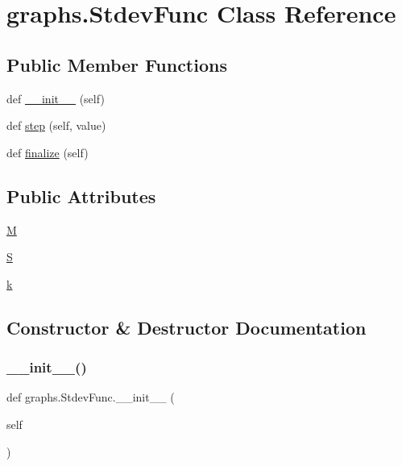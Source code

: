 \hypertarget{classgraphs_1_1StdevFunc}{}\section{graphs.\+Stdev\+Func Class Reference}
\label{classgraphs_1_1StdevFunc}
\subsection*{Public Member Functions}
\begin{DoxyCompactItemize}
\item 
def \hyperlink{classgraphs_1_1StdevFunc_a809899524dcddd0f7211131930e46876}{\+\_\+\+\_\+init\+\_\+\+\_\+} (self)
\item 
def \hyperlink{classgraphs_1_1StdevFunc_aefb049cecc0ce18aad3ba50c40963656}{step} (self, value)
\item 
def \hyperlink{classgraphs_1_1StdevFunc_a8a9ea3289aea6ce5f7ccc581c76c5cac}{finalize} (self)
\end{DoxyCompactItemize}
\subsection*{Public Attributes}
\begin{DoxyCompactItemize}
\item 
\hyperlink{classgraphs_1_1StdevFunc_a2dd9047d6c2873699b2f0ca605690b9c}{M}
\item 
\hyperlink{classgraphs_1_1StdevFunc_ac8455ae1705af7de00108c76e6b9b439}{S}
\item 
\hyperlink{classgraphs_1_1StdevFunc_ae10b59043d31f7f7d967060e21aa368e}{k}
\end{DoxyCompactItemize}


\subsection{Constructor \& Destructor Documentation}
\mbox{\label{classgraphs_1_1StdevFunc_a809899524dcddd0f7211131930e46876}} 
\subsubsection{\texorpdfstring{\+\_\+\+\_\+init\+\_\+\+\_\+()}{\_\_init\_\_()}}
{\footnotesize\ttfamily def graphs.\+Stdev\+Func.\+\_\+\+\_\+init\+\_\+\+\_\+ (\begin{DoxyParamCaption}\item[{}]{self }\end{DoxyParamCaption})}



